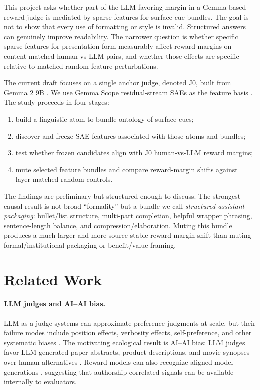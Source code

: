 \documentclass[11pt]{article}
\begin{document}
This project asks whether part of the LLM-favoring margin in a Gemma-based
reward judge is mediated by sparse features for surface-cue bundles. The goal
is not to show that every use of formatting or style is invalid. Structured
answers can genuinely improve readability. The narrower question is whether
specific sparse features for presentation form measurably affect reward margins
on content-matched human-vs-LLM pairs, and whether those effects are specific
relative to matched random feature perturbations.

The current draft focuses on a single anchor judge, denoted J0, built from
Gemma 2 9B \citep{gemmateam2024gemma2}. We use Gemma Scope residual-stream
SAEs as the feature basis \citep{lieberum2024gemmascope}. The study proceeds in
four stages:

\begin{enumerate}[leftmargin=1.5em]
\item build a linguistic atom-to-bundle ontology of surface cues;
\item discover and freeze SAE features associated with those atoms and bundles;
\item test whether frozen candidates align with J0 human-vs-LLM reward margins;
\item mute selected feature bundles and compare reward-margin shifts against
      layer-matched random controls.
\end{enumerate}

The findings are preliminary but structured enough to discuss. The strongest
causal result is not broad ``formality'' but a bundle we call
\emph{structured assistant packaging}: bullet/list structure, multi-part
completion, helpful wrapper phrasing, sentence-length balance, and
compression/elaboration. Muting this bundle produces a much larger and more
source-stable reward-margin shift than muting formal/institutional packaging or
benefit/value framing.

\section{Related Work}

\paragraph{LLM judges and AI--AI bias.}
LLM-as-a-judge systems can approximate preference judgments at scale, but their
failure modes include position effects, verbosity effects, self-preference, and
other systematic biases \citep{zheng2023mtbench,panickssery2024selfrecognition}.
The motivating ecological result is AI--AI bias: LLM judges favor
LLM-generated paper abstracts, product descriptions, and movie synopses over
human alternatives \citep{laurito2025aiaibias}. Reward models can also
recognize aligned-model generations \citep{lee2024remodetect}, suggesting that
authorship-correlated signals can be available internally to evaluators.
\end{document}
